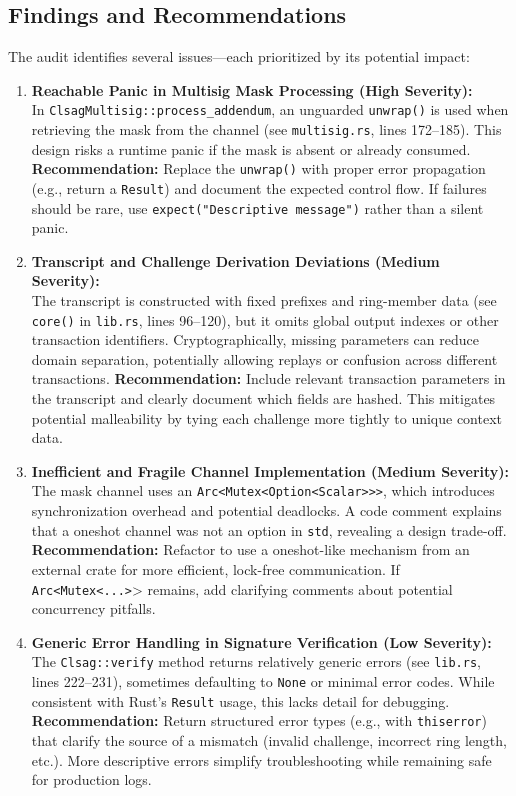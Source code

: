 \documentclass[12pt,a4paper]{article}
\begin{document}
\subsection{Findings and Recommendations}
The audit identifies several issues—each prioritized by its potential impact:

\begin{enumerate}
    \item \textbf{Reachable Panic in Multisig Mask Processing (High Severity):}\\
    In \texttt{ClsagMultisig::process\_addendum}, an unguarded \texttt{unwrap()} is used when retrieving the mask from the channel (see \texttt{multisig.rs}, lines 172--185). This design risks a runtime panic if the mask is absent or already consumed.  
    \textbf{Recommendation:} Replace the \texttt{unwrap()} with proper error propagation (e.g., return a \texttt{Result}) and document the expected control flow. If failures should be rare, use \texttt{expect("Descriptive message")} rather than a silent panic.

    \item \textbf{Transcript and Challenge Derivation Deviations (Medium Severity):}\\
    The transcript is constructed with fixed prefixes and ring-member data (see \texttt{core()} in \texttt{lib.rs}, lines 96--120), but it omits global output indexes or other transaction identifiers. Cryptographically, missing parameters can reduce domain separation, potentially allowing replays or confusion across different transactions.  
    \textbf{Recommendation:} Include relevant transaction parameters in the transcript and clearly document which fields are hashed. This mitigates potential malleability by tying each challenge more tightly to unique context data.

    \item \textbf{Inefficient and Fragile Channel Implementation (Medium Severity):}\\
    The mask channel uses an \texttt{Arc<Mutex<Option<Scalar>>>}, which introduces synchronization overhead and potential deadlocks. A code comment explains that a oneshot channel was not an option in \texttt{std}, revealing a design trade-off.  
    \textbf{Recommendation:} Refactor to use a oneshot-like mechanism from an external crate for more efficient, lock-free communication. If \texttt{Arc<Mutex<...>}> remains, add clarifying comments about potential concurrency pitfalls.

    \item \textbf{Generic Error Handling in Signature Verification (Low Severity):}\\
    The \texttt{Clsag::verify} method returns relatively generic errors (see \texttt{lib.rs}, lines 222--231), sometimes defaulting to \texttt{None} or minimal error codes. While consistent with Rust’s \texttt{Result} usage, this lacks detail for debugging.  
    \textbf{Recommendation:} Return structured error types (e.g., with \texttt{thiserror}) that clarify the source of a mismatch (invalid challenge, incorrect ring length, etc.). More descriptive errors simplify troubleshooting while remaining safe for production logs.
\end{enumerate}
\end{document}
